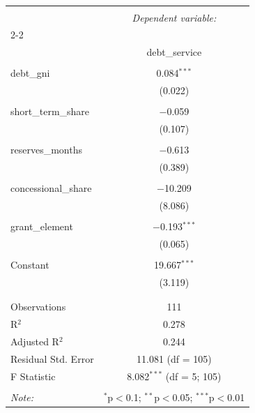 
\begin{table}[!htbp] \centering 
  \caption{} 
  \label{} 
\begin{tabular}{@{\extracolsep{5pt}}lc} 
\\[-1.8ex]\hline 
\hline \\[-1.8ex] 
 & \multicolumn{1}{c}{\textit{Dependent variable:}} \\ 
\cline{2-2} 
\\[-1.8ex] & debt\_service \\ 
\hline \\[-1.8ex] 
 debt\_gni & 0.084$^{***}$ \\ 
  & (0.022) \\ 
  & \\ 
 short\_term\_share & $-$0.059 \\ 
  & (0.107) \\ 
  & \\ 
 reserves\_months & $-$0.613 \\ 
  & (0.389) \\ 
  & \\ 
 concessional\_share & $-$10.209 \\ 
  & (8.086) \\ 
  & \\ 
 grant\_element & $-$0.193$^{***}$ \\ 
  & (0.065) \\ 
  & \\ 
 Constant & 19.667$^{***}$ \\ 
  & (3.119) \\ 
  & \\ 
\hline \\[-1.8ex] 
Observations & 111 \\ 
R$^{2}$ & 0.278 \\ 
Adjusted R$^{2}$ & 0.244 \\ 
Residual Std. Error & 11.081 (df = 105) \\ 
F Statistic & 8.082$^{***}$ (df = 5; 105) \\ 
\hline 
\hline \\[-1.8ex] 
\textit{Note:}  & \multicolumn{1}{r}{$^{*}$p$<$0.1; $^{**}$p$<$0.05; $^{***}$p$<$0.01} \\ 
\end{tabular} 
\end{table} 

